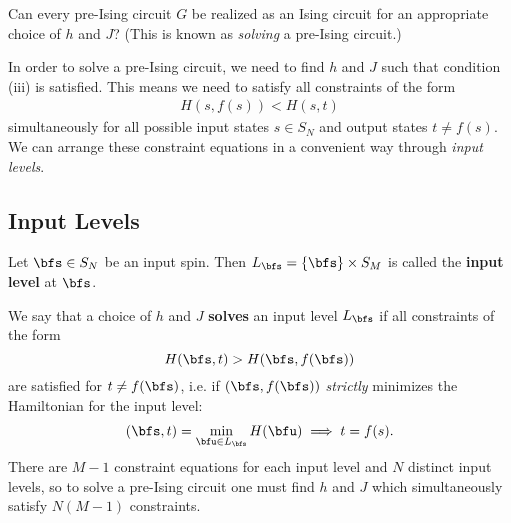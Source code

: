 \documentclass[raggedright, nofonts, notitlepage, openany, debug]{tufte-book}
\begin{document}
\begin{question}\label{q:can-you-always-zingify}
  Can every pre-Ising circuit $G$ be realized as an Ising circuit for an appropriate choice of $h$ and $J$? (This is known as \emph{solving} a pre-Ising circuit.)
\end{question}

In order to solve a pre-Ising circuit, we need to find $h$ and $J$ such that condition (iii) is satisfied. This means we need to satisfy all constraints of the form
\begin{align*}
  H(s,f(s)) < H(s,t)
\end{align*}
simultaneously for all possible input states $s \in S_N$ and output states $t \neq f(s)$. We can arrange these constraint equations in a convenient way through \emph{input levels}.
\subsection{Input Levels}
\begin{defn}
  Let $\bfs \in S_N$ be an input spin. Then $L_{\bfs} = \{\bfs\}\times S_M$ is called the \textbf{input level} at $\bfs$.
\end{defn}
We say that a choice of $h$ and $J$ \textbf{solves} an input level $L_\bfs$ if all constraints of the form
\begin{equation}\label{eqn:constraint}
  H(\bfs,t) > H(\bfs,f(\bfs))
\end{equation}
are satisfied for $t \neq f(\bfs)$, i.e. if $(\bfs, f(\bfs))$ \emph{strictly} minimizes the Hamiltonian for the input level:
\begin{align*}
  (\bfs,t) = \min_{\bfu \in L_\bfs} H(\bfu) \implies t = f(s).
\end{align*}
There are $M-1$ constraint equations for each input level and $N$ distinct input levels, so to solve a pre-Ising circuit one must find $h$ and $J$ which simultaneously satisfy $N(M-1)$ constraints.
\end{document}
